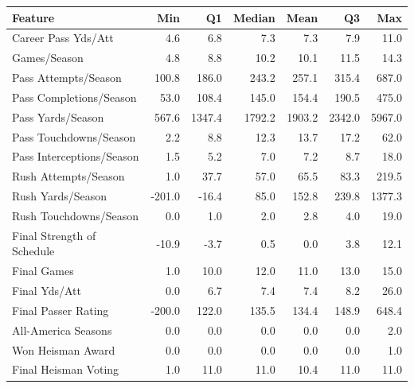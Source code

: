 \begin{tabular}{l|rrrrrr}
Feature & Min & Q1 & Median & Mean & Q3 & Max \\
  \hline
Career Pass Yds/Att & 4.6 & 6.8 & 7.3 & 7.3 & 7.9 & 11.0 \\ 
  Games/Season & 4.8 & 8.8 & 10.2 & 10.1 & 11.5 & 14.3 \\ 
   \hline
Pass Attempts/Season & 100.8 & 186.0 & 243.2 & 257.1 & 315.4 & 687.0 \\ 
  Pass Completions/Season & 53.0 & 108.4 & 145.0 & 154.4 & 190.5 & 475.0 \\ 
  Pass Yards/Season & 567.6 & 1347.4 & 1792.2 & 1903.2 & 2342.0 & 5967.0 \\ 
  Pass Touchdowns/Season & 2.2 & 8.8 & 12.3 & 13.7 & 17.2 & 62.0 \\ 
  Pass Interceptions/Season & 1.5 & 5.2 & 7.0 & 7.2 & 8.7 & 18.0 \\ 
   \hline
Rush Attempts/Season & 1.0 & 37.7 & 57.0 & 65.5 & 83.3 & 219.5 \\ 
  Rush Yards/Season & -201.0 & -16.4 & 85.0 & 152.8 & 239.8 & 1377.3 \\ 
  Rush Touchdowns/Season & 0.0 & 1.0 & 2.0 & 2.8 & 4.0 & 19.0 \\ 
   \hline
Final Strength of Schedule & -10.9 & -3.7 & 0.5 & 0.0 & 3.8 & 12.1 \\ 
  Final Games & 1.0 & 10.0 & 12.0 & 11.0 & 13.0 & 15.0 \\ 
  Final Yds/Att & 0.0 & 6.7 & 7.4 & 7.4 & 8.2 & 26.0 \\ 
  Final Passer Rating & -200.0 & 122.0 & 135.5 & 134.4 & 148.9 & 648.4 \\ 
   \hline
All-America Seasons & 0.0 & 0.0 & 0.0 & 0.0 & 0.0 & 2.0 \\ 
  Won Heisman Award & 0.0 & 0.0 & 0.0 & 0.0 & 0.0 & 1.0 \\ 
  Final Heisman Voting & 1.0 & 11.0 & 11.0 & 10.4 & 11.0 & 11.0 \\ 
\end{tabular}
